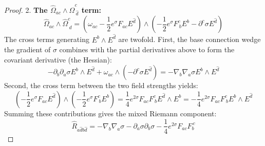 \begin{tcolorbox}[breakable]
\begin{proof}
			2. \textbf{The $\hat{\Omega}_{ac} \wedge \hat{\Omega}^c_{\ \hat{d}}$ term:}
			\begin{equation}
				\hat{\Omega}_{ac} \wedge \hat{\Omega}^c_{\ \hat{d}} = \left( \omega_{ac} - \frac{1}{2} e^\sigma F_{ac} E^{\hat{d}} \right) \wedge \left( -\frac{1}{2} e^\sigma F^c_{\ b} E^b - \partial^c \sigma E^{\hat{d}} \right)
			\end{equation}
			The cross terms generating $E^b \wedge E^{\hat{d}}$ are twofold. First, the base connection wedge the gradient of $\sigma$ combines with the partial derivatives above to form the covariant derivative (the Hessian):
			\begin{equation}
				-\partial_b \partial_a \sigma E^b \wedge E^{\hat{d}} + \omega_{ac} \wedge (-\partial^c \sigma E^{\hat{d}}) = -\nabla_b \nabla_a \sigma E^b \wedge E^{\hat{d}}
			\end{equation}
			Second, the cross term between the two field strengths yields:
			\begin{equation}
				\left( -\frac{1}{2} e^\sigma F_{ac} E^{\hat{d}} \right) \wedge \left( -\frac{1}{2} e^\sigma F^c_{\ b} E^b \right) = \frac{1}{4} e^{2\sigma} F_{ac} F^c_{\ b} E^{\hat{d}} \wedge E^b = -\frac{1}{4} e^{2\sigma} F_{ac} F^c_{\ b} E^b \wedge E^{\hat{d}}
			\end{equation}
			Summing these contributions gives the mixed Riemann component:
			\begin{equation} \label{eq:Rmixed}
				\hat{R}_{a\hat{d}b\hat{d}} = -\nabla_b \nabla_a \sigma - \partial_a \sigma \partial_b \sigma - \frac{1}{4} e^{2\sigma} F_{ac} F_b^{\ c}
			\end{equation}
			

\end{proof}
\end{tcolorbox}
